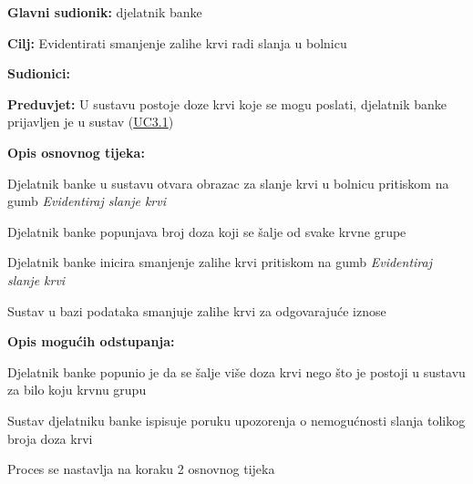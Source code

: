 					
					\noindent {}
					\begin{packed_item} \label{UC13}
	
						\item \textbf{Glavni sudionik: }djelatnik banke
						\item  \textbf{Cilj:} Evidentirati smanjenje zalihe krvi radi slanja u bolnicu
						\item  \textbf{Sudionici:} 
						\item  \textbf{Preduvjet:} U sustavu postoje doze krvi koje se mogu poslati, djelatnik banke prijavljen je u sustav (\hyperref[UC3.1]{UC3.1})
						\item  \textbf{Opis osnovnog tijeka:}
						
						\item[] \begin{packed_enum}
	                        \item Djelatnik banke u sustavu otvara obrazac za slanje krvi u bolnicu pritiskom na gumb \textit{Evidentiraj slanje krvi}
                            \item Djelatnik banke popunjava broj doza koji se šalje od svake krvne grupe
                            \item Djelatnik banke inicira smanjenje zalihe krvi pritiskom na gumb \textit{Evidentiraj slanje krvi}
                        	\item Sustav u bazi podataka smanjuje zalihe krvi za odgovarajuće iznose
						\end{packed_enum}
						
						\item  \textbf{Opis mogućih odstupanja:}
						
						\item[] \begin{packed_item}
						
							\item[3] Djelatnik banke popunio je da se šalje više doza krvi nego što je postoji u sustavu za bilo koju krvnu grupu
							\item[] \begin{packed_enum}
								\item Sustav djelatniku banke ispisuje poruku upozorenja o nemogućnosti slanja tolikog broja doza krvi 
								\item Proces se nastavlja na koraku 2 osnovnog tijeka
							\end{packed_enum}
							

\end{packed_item}
\end{packed_item}
